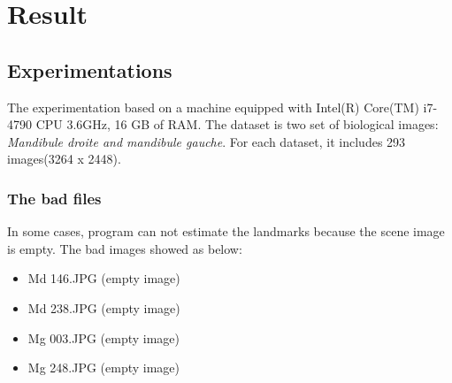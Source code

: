 \chapter{Result}
\section{Experimentations}
The experimentation based on a machine equipped with Intel(R) Core(TM) i7-4790 CPU 3.6GHz, 16 GB of RAM. The dataset is two set of biological images: \textit{Mandibule droite and mandibule gauche}. For each dataset, it includes 293 images(3264 x 2448). 
\subsection{The bad files}
In some cases, program can not estimate the landmarks because the scene image is empty. The bad images showed as below:
\begin{multicols}{2}
\begin{itemize}
\item Md 146.JPG (empty image)
\item Md 238.JPG (empty image)
\item Mg 003.JPG (empty image)
\item Mg 248.JPG (empty image)
\end{itemize} 
\end{multicols}

